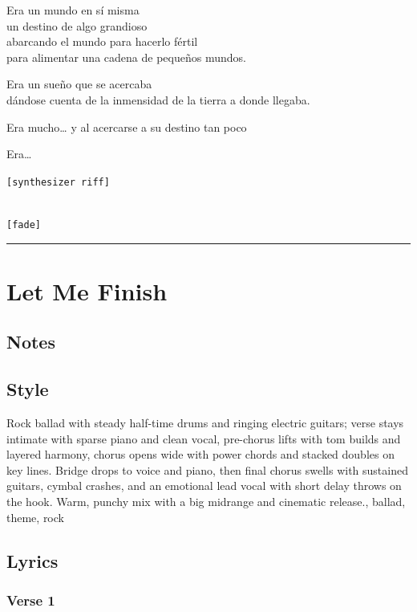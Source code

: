 Era un mundo en sí misma\\
un destino de algo grandioso\\
abarcando el mundo para hacerlo fértil\\
para alimentar una cadena de pequeños mundos.

Era un sueño que se acercaba\\
dándose cuenta de la inmensidad de la tierra a donde llegaba.

Era mucho\ldots{} y al acercarse a su destino tan poco

Era\ldots{}

\texttt{{[}synthesizer\ riff{]}}\strut \\
\texttt{{[}fade{]}}

\begin{center}\rule{0.5\linewidth}{0.5pt}\end{center}

\section{Let Me Finish}\label{let-me-finish}

\subsection{Notes}\label{notes-11}

\subsection{Style}\label{style-10}

Rock ballad with steady half-time drums and ringing electric guitars;
verse stays intimate with sparse piano and clean vocal, pre-chorus lifts
with tom builds and layered harmony, chorus opens wide with power chords
and stacked doubles on key lines. Bridge drops to voice and piano, then
final chorus swells with sustained guitars, cymbal crashes, and an
emotional lead vocal with short delay throws on the hook. Warm, punchy
mix with a big midrange and cinematic release., ballad, theme, rock

\subsection{Lyrics}\label{lyrics-10}

\subsubsection{Verse 1}\label{verse-1-3}

